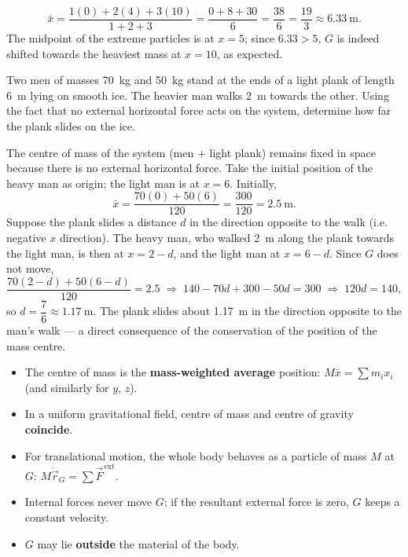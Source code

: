 \documentclass[11pt]{article}
\begin{document}
\begin{corrige}[Exercise 1]
\[
\bar{x}=\frac{1(0)+2(4)+3(10)}{1+2+3}=\frac{0+8+30}{6}=\frac{38}{6}=\frac{19}{3}\approx 6.33\ \mathrm{m}.
\]
The midpoint of the extreme particles is at $x=5$; since $6.33>5$, $G$ is indeed shifted towards the heaviest mass at $x=10$, as expected.
\end{corrige}

\begin{exercice}
Two men of masses \SI{70}{kg} and \SI{50}{kg} stand at the ends of a light plank of length \SI{6}{m} lying on smooth ice. The heavier man walks \SI{2}{m} towards the other. Using the fact that no external horizontal force acts on the system, determine how far the plank slides on the ice.
\end{exercice}

\begin{corrige}[Exercise 2]
The centre of mass of the system (men $+$ light plank) remains fixed in space because there is no external horizontal force. Take the initial position of the heavy man as origin; the light man is at $x=6$. Initially,
\[
\bar{x}=\frac{70(0)+50(6)}{120}=\frac{300}{120}=2.5\ \mathrm{m}.
\]
Suppose the plank slides a distance $d$ in the direction opposite to the walk (i.e. negative $x$ direction). The heavy man, who walked \SI{2}{m} along the plank towards the light man, is then at $x=2-d$, and the light man at $x=6-d$. Since $G$ does not move,
\[
\frac{70(2-d)+50(6-d)}{120}=2.5
\;\Longrightarrow\;
140-70d+300-50d=300
\;\Longrightarrow\;
120d=140,
\]
so $d=\dfrac{7}{6}\approx 1.17\ \mathrm{m}$. The plank slides about \SI{1.17}{m} in the direction opposite to the man's walk — a direct consequence of the conservation of the position of the mass centre.
\end{corrige}

\begin{aretenir}[To remember]
\begin{itemize}
\item The centre of mass is the \textbf{mass-weighted average} position: $M\bar{x}=\sum m_ix_i$ (and similarly for $y$, $z$).
\item In a uniform gravitational field, centre of mass and centre of gravity \textbf{coincide}.
\item For translational motion, the whole body behaves as a particle of mass $M$ at $G$: $M\ddot{\vec{r}}_G=\sum\vec{F}^{\,\mathrm{ext}}$.
\item Internal forces never move $G$; if the resultant external force is zero, $G$ keeps a constant velocity.
\item $G$ may lie \textbf{outside} the material of the body.
\end{itemize}
\end{aretenir}
\end{document}
